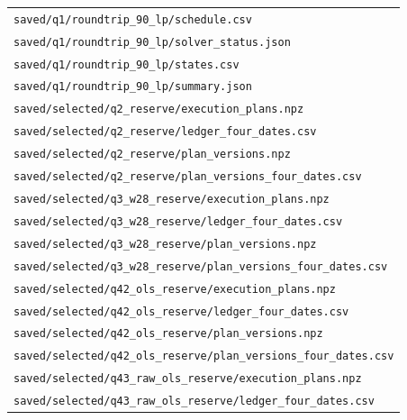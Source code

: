 \begin{longtable}{p{}}
\nolinkurl{saved/q1/roundtrip_90_lp/schedule.csv} \\

\nolinkurl{saved/q1/roundtrip_90_lp/solver_status.json} \\

\nolinkurl{saved/q1/roundtrip_90_lp/states.csv} \\

\nolinkurl{saved/q1/roundtrip_90_lp/summary.json} \\

\nolinkurl{saved/selected/q2_reserve/execution_plans.npz} \\

\nolinkurl{saved/selected/q2_reserve/ledger_four_dates.csv} \\

\nolinkurl{saved/selected/q2_reserve/plan_versions.npz} \\

\nolinkurl{saved/selected/q2_reserve/plan_versions_four_dates.csv} \\

\nolinkurl{saved/selected/q3_w28_reserve/execution_plans.npz} \\

\nolinkurl{saved/selected/q3_w28_reserve/ledger_four_dates.csv} \\

\nolinkurl{saved/selected/q3_w28_reserve/plan_versions.npz} \\

\nolinkurl{saved/selected/q3_w28_reserve/plan_versions_four_dates.csv} \\

\nolinkurl{saved/selected/q42_ols_reserve/execution_plans.npz} \\

\nolinkurl{saved/selected/q42_ols_reserve/ledger_four_dates.csv} \\

\nolinkurl{saved/selected/q42_ols_reserve/plan_versions.npz} \\

\nolinkurl{saved/selected/q42_ols_reserve/plan_versions_four_dates.csv} \\

\nolinkurl{saved/selected/q43_raw_ols_reserve/execution_plans.npz} \\

\nolinkurl{saved/selected/q43_raw_ols_reserve/ledger_four_dates.csv} \\


\end{longtable}
